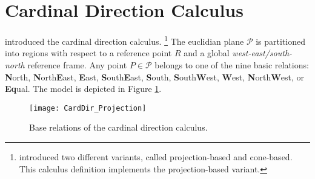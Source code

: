 \section{Cardinal Direction Calculus}\label{sec:carddir}



\citet{frank-ACSM:91} introduced the cardinal direction calculus.%
\footnote{\citeauthor{frank-ACSM:91} introduced two different variants, called projection-based and cone-based. This calculus definition implements the projection-based variant.}
The euclidian plane $\mathcal{P}$ is partitioned into regions
with respect to a reference point $R$ and a global
\emph{west-east/south-north} reference frame.
Any point $P\in\mathcal{P}$ belongs to
one of the nine basic relations:
\textbf{N}orth, \textbf{N}orth\textbf{E}ast,
\textbf{E}ast, \textbf{S}outh\textbf{E}ast,
\textbf{S}outh, \textbf{S}outh\textbf{W}est,
\textbf{W}est, \textbf{N}orth\textbf{W}est,
or \textbf{Eq}ual.
The model is depicted in Figure \ref{fig:CardDir}.

\begin{figure}[htp]
	\centering
	\texttt{[image: CardDir\_Projection]}
	\caption{Base relations of the cardinal direction calculus.}
	\label{fig:CardDir}
\end{figure}

